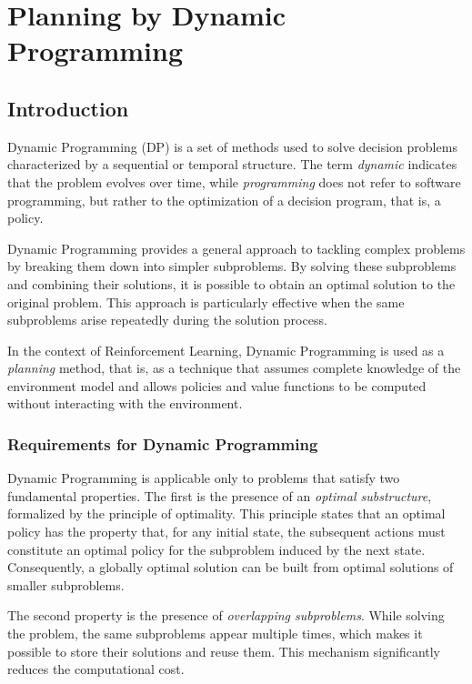 \chapter{Planning by Dynamic Programming}

\section{Introduction}

Dynamic Programming (DP) is a set of methods used to solve decision problems characterized by a sequential or temporal structure. The term \emph{dynamic} indicates that the problem evolves over time, while \emph{programming} does not refer to software programming, but rather to the optimization of a decision program, that is, a policy.

Dynamic Programming provides a general approach to tackling complex problems by breaking them down into simpler subproblems. By solving these subproblems and combining their solutions, it is possible to obtain an optimal solution to the original problem. This approach is particularly effective when the same subproblems arise repeatedly during the solution process.

In the context of Reinforcement Learning, Dynamic Programming is used as a \emph{planning} method, that is, as a technique that assumes complete knowledge of the environment model and allows policies and value functions to be computed without interacting with the environment.


\subsection{Requirements for Dynamic Programming}

Dynamic Programming is applicable only to problems that satisfy two fundamental properties. The first is the presence of an \emph{optimal substructure}, formalized by the principle of optimality. This principle states that an optimal policy has the property that, for any initial state, the subsequent actions must constitute an optimal policy for the subproblem induced by the next state. Consequently, a globally optimal solution can be built from optimal solutions of smaller subproblems.

The second property is the presence of \emph{overlapping subproblems}. While solving the problem, the same subproblems appear multiple times, which makes it possible to store their solutions and reuse them. This mechanism significantly reduces the computational cost.

